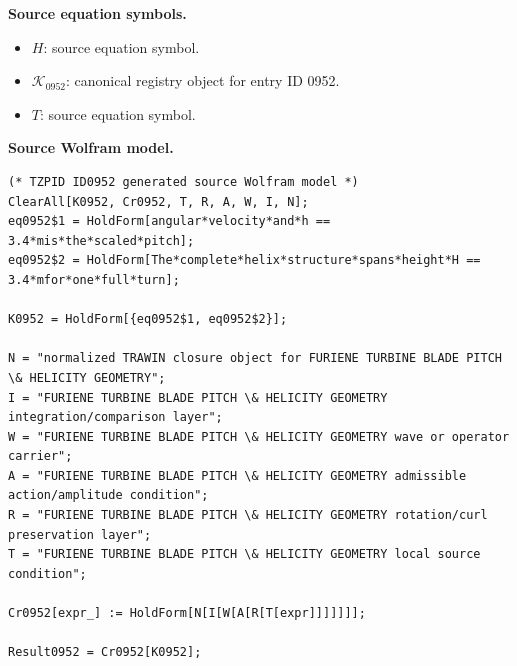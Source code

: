\begin{minipage}[t]{0.49\linewidth}
\begingroup
\small
\raggedright
\textbf{Source equation symbols.}\par
\begin{itemize}[leftmargin=1.35em,itemsep=1pt,topsep=1pt,parsep=0pt]
    \item $H$: source equation symbol.
    \item $\mathcal{K}_{0952}$: canonical registry object for entry ID 0952.
    \item $T$: source equation symbol.
\end{itemize}
\endgroup
\end{minipage}\hfill
\begin{minipage}[t]{0.47\linewidth}
\begingroup
\scriptsize
\raggedright
\textbf{Source Wolfram model.}\par
\begin{Verbatim}[fontsize=\tiny,breaklines=true,breakanywhere=true]
(* TZPID ID0952 generated source Wolfram model *)
ClearAll[K0952, Cr0952, T, R, A, W, I, N];
eq0952$1 = HoldForm[angular*velocity*and*h == 3.4*mis*the*scaled*pitch];
eq0952$2 = HoldForm[The*complete*helix*structure*spans*height*H == 3.4*mfor*one*full*turn];

K0952 = HoldForm[{eq0952$1, eq0952$2}];

N = "normalized TRAWIN closure object for FURIENE TURBINE BLADE PITCH \& HELICITY GEOMETRY";
I = "FURIENE TURBINE BLADE PITCH \& HELICITY GEOMETRY integration/comparison layer";
W = "FURIENE TURBINE BLADE PITCH \& HELICITY GEOMETRY wave or operator carrier";
A = "FURIENE TURBINE BLADE PITCH \& HELICITY GEOMETRY admissible action/amplitude condition";
R = "FURIENE TURBINE BLADE PITCH \& HELICITY GEOMETRY rotation/curl preservation layer";
T = "FURIENE TURBINE BLADE PITCH \& HELICITY GEOMETRY local source condition";

Cr0952[expr_] := HoldForm[N[I[W[A[R[T[expr]]]]]]];

Result0952 = Cr0952[K0952];
\end{Verbatim}
\endgroup
\end{minipage}


